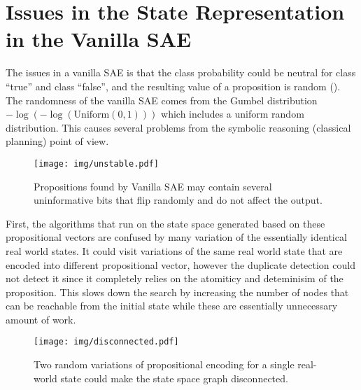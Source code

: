 

\section{Issues in the State Representation in the Vanilla SAE}
\label{issues}

The issues in a vanilla SAE is that the class probability could be
neutral for class ``true'' and class ``false'', and the resulting value
of a proposition is random ().
The randomness of the vanilla SAE comes from
the Gumbel distribution $-\log (-\log (\text{Uniform}(0,1)))$ which includes
a uniform random distribution.
This causes several problems from the symbolic reasoning (classical planning) point of view.

\begin{figure}[htb]
 \centering
 \texttt{[image: img/unstable.pdf]}
 \caption{Propositions found by Vanilla SAE may contain several uninformative bits
 that flip randomly and do not affect the output.}
 \label{unstable}
\end{figure}

First, the algorithms that run on the state space generated based on these propositional vectors
are confused by many variation of the essentially identical real world states.
It could visit variations of the same real world state that are encoded into different propositional vector,
however the duplicate detection could not detect it since it completely relies on the atomiticy and deteminisim of the
proposition. This slows down the search by increasing the number of nodes that can be reachable from the initial state
while these are essentially unnecessary amount of work.

\begin{figure}[htb]
 \centering
 \texttt{[image: img/disconnected.pdf]}
 \caption{Two random variations of propositional encoding for a single real-world state could make the state space graph disconnected.}
 \label{disconnected}
\end{figure}


